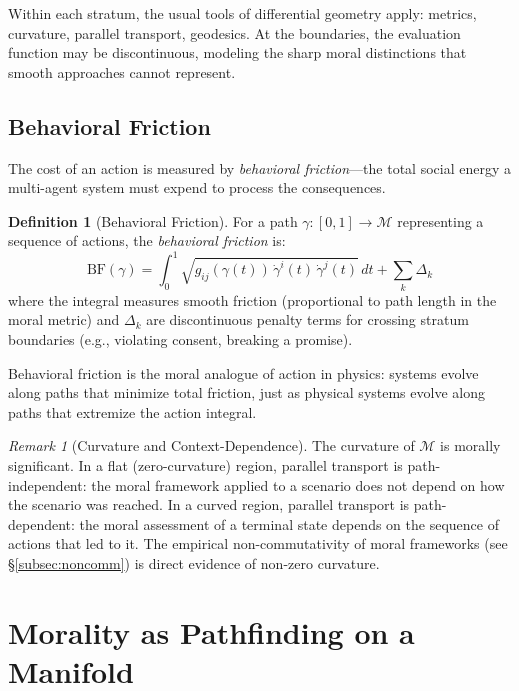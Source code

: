 \documentclass[12pt]{article}
\theoremstyle{definition}
\newtheorem{definition}[theorem]{Definition}
\theoremstyle{remark}
\newtheorem{remark}[theorem]{Remark}
\newcommand{\M}{\mathcal{M}}
\newcommand{\BF}{\mathrm{BF}}
\begin{document}
Within each stratum, the usual tools of differential geometry apply: metrics, curvature, parallel transport, geodesics. At the boundaries, the evaluation function may be discontinuous, modeling the sharp moral distinctions that smooth approaches cannot represent.

\subsection{Behavioral Friction}

The cost of an action is measured by \emph{behavioral friction}---the total social energy a multi-agent system must expend to process the consequences.

\begin{definition}[Behavioral Friction]
\label{def:bf}
For a path $\gamma: [0,1] \to \M$ representing a sequence of actions, the \emph{behavioral friction} is:
\begin{equation}
\BF(\gamma) = \int_0^1 \sqrt{g_{ij}(\gamma(t))\, \dot{\gamma}^i(t)\, \dot{\gamma}^j(t)}\, dt + \sum_k \Delta_k
\label{eq:bf}
\end{equation}
where the integral measures smooth friction (proportional to path length in the moral metric) and $\Delta_k$ are discontinuous penalty terms for crossing stratum boundaries (e.g., violating consent, breaking a promise).
\end{definition}

Behavioral friction is the moral analogue of action in physics: systems evolve along paths that minimize total friction, just as physical systems evolve along paths that extremize the action integral.

\begin{remark}[Curvature and Context-Dependence]
The curvature of $\M$ is morally significant. In a flat (zero-curvature) region, parallel transport is path-independent: the moral framework applied to a scenario does not depend on how the scenario was reached. In a curved region, parallel transport is path-dependent: the moral assessment of a terminal state depends on the sequence of actions that led to it. The empirical non-commutativity of moral frameworks (see \S\ref{subsec:noncomm}) is direct evidence of non-zero curvature.
\end{remark}


\section{Morality as Pathfinding on a Manifold}
\label{sec:pathfinding}
\end{document}
